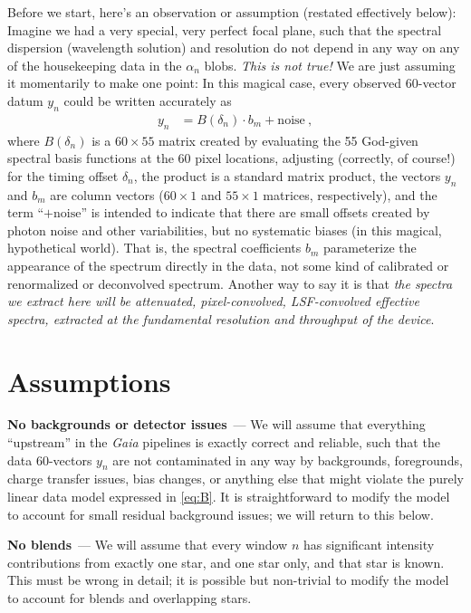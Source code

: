 \documentclass[11pt]{article}
\renewcommand{\paragraph}[1]{\medskip\par\noindent\textbf{#1}~---}
\begin{document}
Before we start, here's an observation or assumption (restated effectively below):
Imagine we had a very special, very perfect focal plane, such that the spectral dispersion (wavelength solution) and resolution do not depend in any way on any of the housekeeping data in the $\alpha_n$ blobs.
\emph{This is not true!} We are just assuming it momentarily to make one point:
In this magical case, every observed 60-vector datum $y_n$ could be written accurately as
\begin{align}
    y_n &= B(\delta_n)\cdot b_m + \mbox{noise} ~,\label{eq:B}
\end{align}
where $B(\delta_n)$ is a $60\times 55$ matrix created by evaluating the 55 God-given spectral basis functions at the 60 pixel locations, adjusting (correctly, of course!) for the timing offset $\delta_n$,
the product is a standard matrix product,
the vectors $y_n$ and $b_m$ are column vectors ($60\times 1$ and $55\times 1$ matrices, respectively),
and the term ``$+\mbox{noise}$'' is intended to indicate that there are small offsets created by photon noise and other variabilities, but no systematic biases (in this magical, hypothetical world).
That is, the spectral coefficients $b_m$ parameterize the appearance of the spectrum directly in the data, not some kind of calibrated or renormalized or deconvolved spectrum.
Another way to say it is that \emph{the spectra we extract here will be attenuated, pixel-convolved, LSF-convolved effective spectra, extracted at the fundamental resolution and throughput of the device}.

\section{Assumptions}

\paragraph{No backgrounds or detector issues}
We will assume that everything ``upstream'' in the \textsl{Gaia} pipelines is exactly correct and reliable, such that the data 60-vectors $y_n$ are not contaminated in any way by backgrounds, foregrounds, charge transfer issues, bias changes, or anything else that might violate the purely linear data model expressed in \eqref{eq:B}.
It is straightforward to modify the model to account for small residual background issues; we will return to this below.

\paragraph{No blends}
We will assume that every window $n$ has significant intensity contributions from exactly one star, and one star only, and that star is known.
This must be wrong in detail; it is possible but non-trivial to modify the model to account for blends and overlapping stars.
\end{document}
